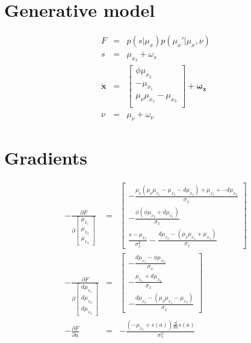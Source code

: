 \documentclass[a4paper]{report}
\begin{document}
\section*{Generative model}

\begin{eqnarray}
  F&=&p(s|\mu_x)p(\mu_x'|\mu_x,\nu)\nonumber\\
  s &=& \mu_{x_3} + \omega_s \nonumber \\
  \dot{\mathbf{x}} &=&
  \left[\begin{array}{c}
  \phi\mu_{x_2} \\
  -\mu_{x_1} \\
  \mu_{\nu}\mu_{x_1} - \mu_{x_3} \\
  \end{array}\right] +\boldsymbol{\omega_x}\nonumber \\
  \nu &=& \mu_{\nu} + \omega_{\nu} \nonumber
\end{eqnarray}

\section*{Gradients}
\begin{eqnarray}
- \frac{\partial F}{\partial
  \left[\begin{matrix}
  \mu_{x_1}\\\mu_{x_2}\\\mu_{x_3}\end{matrix}\right]} &=&
  \left[\begin{matrix}
  -\frac{\mu_{\nu}(\mu_{\nu}\mu_{x_1} - \mu_{x_3} - d\mu_{x_3}) + \mu_{x_1}  +
  -d\mu_{x_2}}{\sigma_x}\\
  - \frac{\phi(\phi\mu_{x_2} + d\mu_{x_1})}{\sigma_x}\\
   \frac{s -\mu_{x_3}}{\sigma_s^{2}} - \frac{d\mu_{x_3} - (\mu_{\nu}\mu_{x_1} +
   \mu_{x_3})}{\sigma_x}

  \end{matrix}\right]
  \nonumber \\
   - \frac{\partial F}{\partial
     \left[\begin{matrix}d\mu_{x_1}\\d\mu_{x_2}\\d\mu_{x_3}\end{matrix}\right]}
     &=& \left[\begin{matrix}
     - \frac{d\mu_{x_1} -\phi\mu_{x_2} }{\sigma_x}\\
     - \frac{\mu_{x_1}+ d\mu_{x_2}}{\sigma_x}\\
     - \frac{d\mu_{x_3} - (\mu_{\nu}\mu_{x_1} - \mu_{x_3})}{\sigma_x}
     \end{matrix}\right]\nonumber\\
  - \frac{\partial F}{\partial a} &=& - \frac{\left(- \mu_{x_3} + s{\left(a
    \right)}\right) \frac{d}{d a} s{\left(a \right)}}{\sigma_s^{2}} \nonumber
\end{eqnarray}
\end{document}
